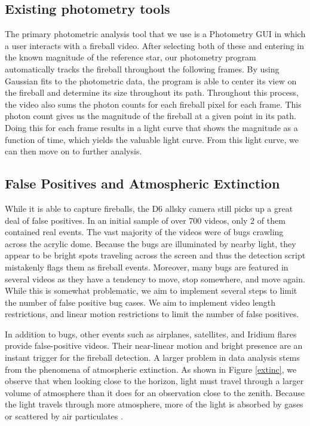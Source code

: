 \subsection{Existing photometry tools}
The primary photometric analysis tool that we use is a Photometry GUI in which a user interacts with a fireball video.
After selecting both of these and entering in the known magnitude of the reference star, our photometry program automatically tracks the fireball throughout the following frames.
By using Gaussian fits to the photometric data, the program is able to center its view on the fireball and determine its size throughout its path.
Throughout this process, the video also sums the photon counts for each fireball pixel for each frame.
This photon count gives us the magnitude of the fireball at a given point in its path.
Doing this for each frame results in a light curve that shows the magnitude as a function of time, which yields the valuable light curve.
From this light curve, we can then move on to further analysis.

\subsection{False Positives and Atmospheric Extinction}

While it is able to capture fireballs, the D6 allsky camera still picks up a great deal of false positives.
In an initial sample of over $700$ videos, only $2$ of them contained real events.
The vast majority of the videos were of bugs crawling across the acrylic dome.
Because the bugs are illuminated by nearby light, they appear to be bright spots traveling across the screen and thus the detection script mistakenly flags them as fireball events.
Moreover, many bugs are featured in several videos as they have a tendency to move, stop somewhere, and move again.
While this is somewhat problematic, we aim to implement several steps to limit the number of false positive bug cases.
We aim to implement video length restrictions, and linear motion restrictions to limit the number of false positives.

In addition to bugs, other events such as airplanes, satellites, and Iridium flares provide false-positive videos.
Their near-linear motion and bright presence are an instant trigger for the fireball detection.
A larger problem in data analysis stems from the phenomena of atmospheric extinction.
As shown in Figure \ref{extinc}, we observe that when looking close to the horizon, light must travel through a larger volume of atmosphere than it does for an observation close to the zenith.  
Because the light travels through more atmosphere, more of the light is absorbed by gases or scattered by air particulates \cite{hughes_atmospheric_2016}.


